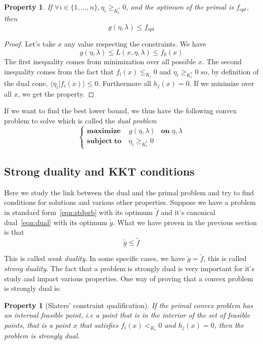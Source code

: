 \documentclass[10pt]{report}
\theoremstyle{plain}
\newtheorem{prop}[thm]{Property}
\theoremstyle{definition}
\theoremstyle{remark}
\newcommand{\braket}[2]{\langle#1|#2\rangle}
\renewcommand{\geq}{\geqslant}
\renewcommand{\leq}{\leqslant}
\newcommand{\maxim}[3]{\begin{cases}
    \mathbf{maximize}\,\quad #1& \mathbf{on}\; #2\\
    \mathbf{subject\;to}\quad #3
  \end{cases}}
\begin{document}
\begin{prop}
  If $\forall i \in \{1,\ldots,n\}, \eta_i \geq_{K_i^*} 0$, and the optimum of the primal is
  $f_{opt}$, then
  \[g(\eta,\lambda) \leq f_{opt}\]
\end{prop}

\begin{proof}
  Let's take $x$ any value respecting the constraints. We have
  \[g(\eta,\lambda) \le L(x,\eta,\lambda) \le f_0(x)\]
  The first inequality comes from minimization over all possible $x$.
  The second inequality comes from the fact that $f_i(x) \leq_{K_i} 0$ and
  $\eta_i \geq_{K_i^*} 0$ so, by definition of the dual cone, $\braket
  {\eta_i}{f_i(x)} \leq 0$. Furthermore all $h_j(x) = 0$. If we minimize over
  all $x$, we get the property.
\end{proof}

If we want to find the best lower bound, we thus have the following convex
problem to solve which is called the \emph{dual problem}
\begin{equation}\label{eqn:dual}
\maxim{g(\eta,\lambda)}{\eta,\lambda}{\eta_i \geq_{K_i^*} 0}
\end{equation}

\subsection{Strong duality and KKT conditions}

Here we study the link between the dual and the primal problem and try to find
conditions for solutions and various other properties. Suppose we have a problem in
standard form~\ref{eqn:stdprb} with its optimum $\tilde f$ and it's canonical
dual~\ref{eqn:dual} with its optimum $\tilde g$. What we have proven in the
previous section is that
\[\tilde g \leq \tilde f\]

This is called \emph{weak duality}. In some specific cases, we have $\tilde g =
\tilde f$, this is called \emph{strong duality}. The fact that a problem is
strongly dual is very important for it's study and impact various properties.
One way of proving that a convex problem is strongly dual is:
\begin{prop}[Slaters' constraint qualification]\label{prop:slater}
  If the primal convex problem has an internal feasible point, i.e a point that is in
  the interior of the set of feasible points, that is a point $x$ that satisfies
  $f_i(x) <_{K_i} 0$ and $h_j(x) = 0$, then the problem is strongly dual.
\end{prop}
\end{document}

